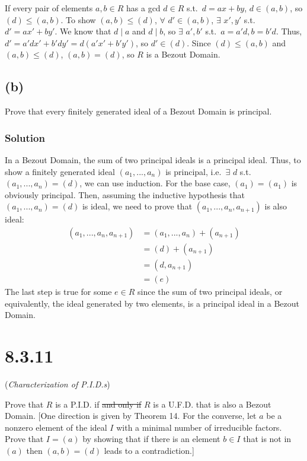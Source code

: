 \documentclass[fleqn]{article}
\begin{document}
            If every pair of elements $a, b \in R$ has a gcd $d \in R$ s.t.\ $d = ax + by$, $d \in (a, b)$, so $(d) \leq (a, b)$.  To show $(a, b) \leq (d)$, $\forall$ $d' \in (a, b)$, $\exists$ $x', y'$ s.t.\ $d' = ax' + by'$.  We know that $d \mid a$ and $d \mid b$, so $\exists$ $a', b'$ s.t.\ $a = a'd, b = b'd$.  Thus, $d' = a'dx' + b'dy' = d(a'x' + b'y')$, so $d' \in (d)$.  Since $(d) \leq (a, b)$ and $(a, b) \leq (d)$, $(a, b) = (d)$, so $R$ is a Bezout Domain.
        
        \pagebreak
        
        \subsection{(b)}
        Prove that every finitely generated ideal of a Bezout Domain is principal.
        
            \subsubsection{Solution}
            In a Bezout Domain, the sum of two principal ideals is a principal ideal.  Thus, to show a finitely generated ideal $(a_1, ..., a_n)$ is principal, i.e.\ $\exists$ $d$ s.t.\ $(a_1, ..., a_n) = (d)$, we can use induction.  For the base case, $(a_1) = (a_1)$ is obviously principal.  Then, assuming the inductive hypothesis that $(a_1, ..., a_n) = (d)$ is ideal, we need to prove that $(a_1, ..., a_n, a_{n + 1})$ is also ideal:
            \begin{align}
                (a_1, ..., a_n, a_{n + 1}) &= (a_1, ..., a_n) + (a_{n + 1}) \\
                    &= (d) + (a_{n + 1}) \\
                    &= (d, a_{n + 1}) \\
                    &= (e)
            \end{align}
            The last step is true for some $e \in R$ since the sum of two principal ideals, or equivalently, the ideal generated by two elements, is a principal ideal in a Bezout Domain.
    
    \section{8.3.11}
    (\textit{Characterization of P.I.D.s})
    
    Prove that $R$ is a P.I.D. if \sout{and only if} $R$ is a U.F.D. that is also a Bezout Domain.  [One direction is given by Theorem 14.  For the converse, let $a$ be a nonzero element of the ideal $I$ with a minimal number of irreducible factors.  Prove that $I = (a)$ by showing that if there is an element $b \in I$ that is not in $(a)$ then $(a, b) = (d)$ leads to a contradiction.]
        
\end{document}
